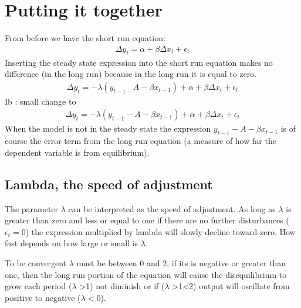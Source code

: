 \documentclass[letterpaper,10pt,english]{jupyterBook}
\begin{document}
\section{Putting it together}
\label{\detokenize{content/06_WBModels/LoadingWBModel:putting-it-together}}
\sphinxAtStartPar
From before we have the short run equation:
\begin{equation*}
\begin{split}\Delta y_t = \alpha + \beta \Delta x_t +\epsilon_t\end{split}
\end{equation*}
\sphinxAtStartPar
Inserting the steady state expression into the short run equation makes no difference (in the long run) because in the long run it is equal to zero.
\begin{equation*}
\begin{split}\Delta y_t = -\lambda(y_{t-1-}A-βx_{t-1})  + \alpha + \beta \Delta x_t +\epsilon_t\end{split}
\end{equation*}
\sphinxAtStartPar
Ib : small change to 
\begin{equation*}
\begin{split}\Delta y_t = -\lambda(y_{t-1}-A-βx_{t-1})  + \alpha + \beta \Delta x_t +\epsilon_t\end{split}
\end{equation*}
\sphinxAtStartPar
When the model is not in the steady state the expression \(y_{t-1}-A-βx_{t-1}\) is of course the error term from the long run equation (a measure of how far the dependent variable is from equilibrium).


\subsection{Lambda, the speed of adjustment}
\label{\detokenize{content/06_WBModels/LoadingWBModel:lambda-the-speed-of-adjustment}}
\sphinxAtStartPar
The parameter \(\lambda\) can be interpreted as the speed of adjustment.  As long as \(\lambda\) is greater than zero and less or equal to one if there are no further disturbances ( \(\epsilon_t=0\)) the expression multiplied by lambda will slowly decline toward zero. How fast depends on how large or small is \(\lambda\).

\sphinxAtStartPar
To be convergent \(\lambda\) must be between 0 and 2, if its is negative or greater than one, then the long run portion of the equation will cause the disequilibrium to grow each period (\(\lambda\) >1) not diminish or if  (\(\lambda\) >1<2) output will oscillate from positive to negative (\(\lambda <0\)).
\end{document}
